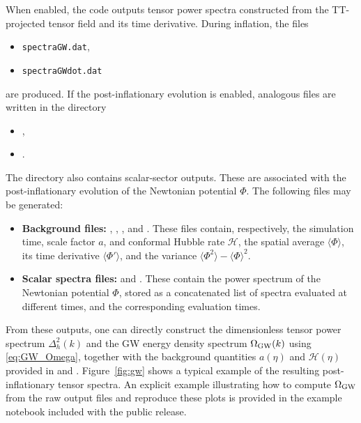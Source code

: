 \documentclass[aps, nofootinbib,superscriptaddress, preprintnumbers, longbibliography]{article}
\begin{document}
When enabled, the code outputs tensor power spectra constructed from the TT-projected tensor field and its time derivative. During inflation, the files
\begin{itemize}
    \item \texttt{spectraGW.dat},
    \item \texttt{spectraGWdot.dat}
\end{itemize}
are produced. If the post-inflationary evolution is enabled, analogous files are written in the directory
\begin{itemize}
    \item {},
    \item {}.
\end{itemize}
The  directory also contains scalar-sector outputs.
These are associated with the post-inflationary evolution of the Newtonian potential $\Phi$.
The following files may be generated:
\begin{itemize}
    \item \textbf{Background files:}
    , ,
    , and .
    These files contain, respectively, the simulation time, scale factor $a$, and conformal Hubble rate $\mathcal{H}$, the spatial average $\langle \Phi \rangle$, its time derivative $\langle \Phi' \rangle$, and the variance $\langle \Phi^2 \rangle - \langle \Phi \rangle^2$.
    \item \textbf{Scalar spectra files:}
     and .
    These contain the power spectrum of the Newtonian potential $\Phi$, stored as a concatenated list of spectra evaluated at different times, and the corresponding evaluation times.
\end{itemize}
 From these outputs, one can directly construct the dimensionless tensor power spectrum $\Delta_h^2(k)$ and the GW energy density spectrum $\Omega_{\rm GW}(k)$ using \cref{eq:GW_Omega}, together with the background quantities $a(\eta)$ and $\mathcal{H}(\eta)$ provided in  and . Figure~\ref{fig:gw} shows a typical example of the resulting post-inflationary tensor spectra. An explicit example illustrating how to compute $\Omega_{\rm GW}$ from the raw output files and reproduce these plots is provided in the example notebook included with the public release.
\end{document}
